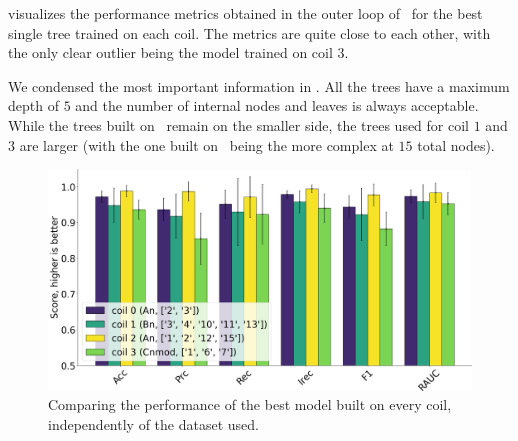  visualizes the performance metrics obtained in the outer loop of \ncv\ for the best single
tree trained on each coil. The metrics are quite close to each other, with the only clear outlier
being the model trained on coil $3$.

We condensed the most important information in . All the trees have a
maximum depth of $5$ and the number of internal nodes and leaves is always acceptable. While the
trees built on \an\ remain on the smaller side, the trees used for coil $1$ and $3$ are larger (with
the one built on \cnmod\ being the more complex at $15$ total nodes).
\begin{figure}[!ht]
	\centering
	\includegraphics[width=\linewidth]{img/best_dts_qlp.png}
	\caption{Comparing the performance of the best model built on every coil, independently of
		the dataset used.} \label{fig:bdts-qlp}
\end{figure}

